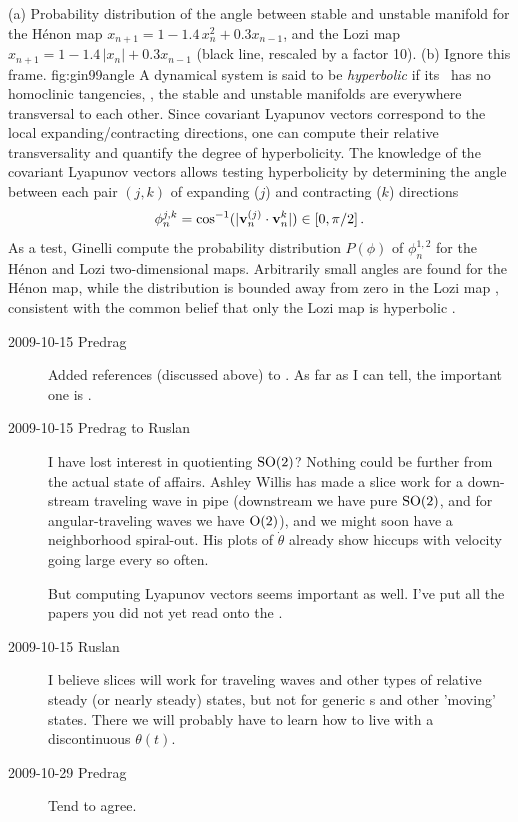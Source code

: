 %
{}{
(a) Probability distribution of the angle between stable and
unstable manifold for the H\'enon map $x_{n+1} = 1 -1.4\,
x_n^2 + 0.3 x_{n-1}$, and the Lozi map $x_{n+1} = 1
-1.4\,|x_n| + 0.3 x_{n-1}$ (black line, rescaled by a factor
10). (b) Ignore this frame.
}{fig:gin99angle} %
%
%
A dynamical system is said to be \emph{hyperbolic} if its
\statesp\ has no homoclinic tangencies, \ie, the stable and
unstable manifolds are everywhere transversal to each other.
Since covariant Lyapunov vectors correspond to the local
expanding/contracting directions, one can compute their
relative transversality and quantify the degree of hyperbolicity.
The knowledge of the covariant Lyapunov vectors allows testing hyperbolicity by
determining the angle between each pair $(j,k)$ of expanding
($j$) and contracting ($k$) directions
\[
\phi_n^{j,k} = \cos^{-1}(|{\bf v}_n^{(j)} \cdot{\bf v}_n^k|) \in [0,\pi/2]
\,.
\]
As a test, Ginelli \etal{} compute the
probability distribution $P(\phi)$ of $\phi_n^{1,2}$ for the
H\'enon and Lozi two-dimensional maps. Arbitrarily small
angles are found for the H\'enon map, while the distribution
is bounded away from zero in the Lozi map ,
consistent with the common belief that
only the Lozi map is hyperbolic .

\begin{description}
\item[2009-10-15 Predrag]
Added references 
(discussed above) to
. As far as I can tell, the important one is
.

\item[2009-10-15 Predrag to Ruslan]
I have lost interest in quotienting $\textrm{SO}(2)$? Nothing could
be further from the actual state of affairs. Ashley Willis
has made a slice work for a down-stream traveling wave in
pipe (downstream we have pure $\textrm{SO}(2)$, and for
angular-traveling waves we have $\textrm{O}(2)$), and we might soon have a
neighborhood spiral-out. His plots of $\dot{\theta}$ already
show hiccups with velocity going large every so often.

But computing Lyapunov vectors seems important as well. I've
put all the papers you did not yet read onto the
.

\item[2009-10-15 Ruslan]
I believe slices will work for traveling waves and other
types of relative steady (or nearly steady) states, but not
for generic \rpo s and other 'moving' states.  There we will
probably have to learn how to live with a discontinuous
$\theta(t)$.

\item[2009-10-29 Predrag] Tend to agree.

%
%
\end{description}

